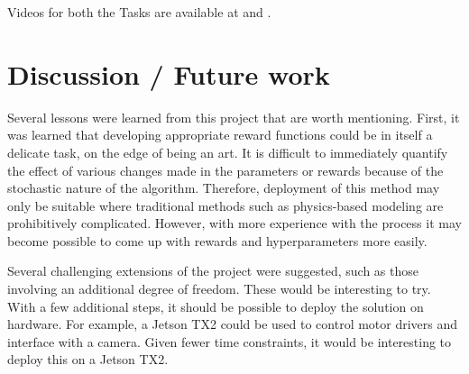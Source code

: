 \documentclass[10pt,journal,compsoc]{IEEEtran}
\begin{document}
Videos for both the Tasks are available at \cite{Youtube1} and \cite{Youtube2}. 
\section{Discussion / Future work}

Several lessons were learned from this project that are worth mentioning. First, it was learned that developing appropriate reward functions could be in itself a delicate task, on the edge of being an art. It is difficult to immediately quantify the effect of various changes made in the parameters or rewards because of the stochastic nature of the algorithm. Therefore, deployment of this method may only be suitable where traditional methods such as physics-based modeling are prohibitively complicated. However, with more experience with the process it may become possible to come up with rewards and hyperparameters more easily. 

Several challenging extensions of the project were suggested, such as those involving an additional degree of freedom. These would be interesting to try. 
With a few additional steps, it should be possible to deploy the solution on hardware. For example, a Jetson TX2 could be used to control motor drivers and interface with a camera. Given fewer time constraints, it would be interesting to deploy this on a Jetson TX2. 




\end{document}
